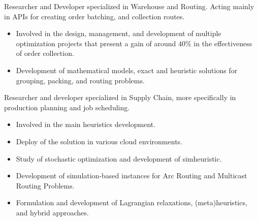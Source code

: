 \documentclass[10pt,a4paper,ragged2e,withhyper]{altacv}
\begin{document}
\begin{paracol}{2}
            {Researcher and Developer specialized in Warehouse and Routing. Acting mainly in APIs for creating order batching, and collection routes}. \\
            \medskip
            \begin{itemize}
                \item Involved in the design, management, and development of
                  multiple optimization projects that present a gain of around $40\%$ in the effectiveness of order collection.
                \item Development of mathematical models, exact and heuristic solutions for grouping, packing, and routing problems.
            \end{itemize}
        \vspace*{-0.2cm}
        \divider
            {Researcher and developer specialized in Supply Chain, more specifically in production
              planning and job scheduling}.\\
            \medskip
            \begin{itemize}
                \item Involved in the main heuristics development.
                \item Deploy of the solution in various cloud environments.
            \end{itemize}
        \vspace*{-0.2cm}
	      \begin{itemize}
	            \item Study of stochastic optimization and development of simheuristic.
	            \item Development of simulation-based instances for Arc Routing and Multicast Routing Problems. 
		        \item Formulation and development of Lagrangian relaxations, (meta)heuristics, and hybrid approaches.
		  \end{itemize}
		\divider
		\medskip

\end{paracol}
\end{document}
